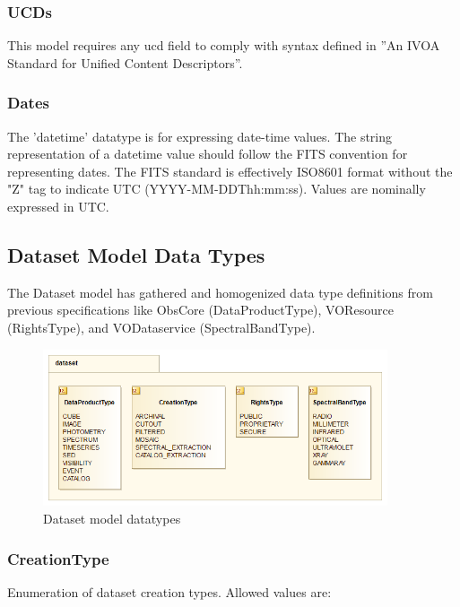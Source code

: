   \subsubsection{UCDs}
  \label{sect:ucds}
  This model requires any ucd field to comply with syntax defined in ”An IVOA
  Standard for Unified Content Descriptors”\citep{2005ivoa.spec.0819D}.
  
  \subsubsection{Dates}
  \label{sect:dates}
  The 'datetime' datatype is for expressing date-time values. The string
  representation of a datetime value should follow the FITS convention for
  representing dates. The FITS standard is effectively ISO8601 format without
  the "Z" tag to indicate UTC (YYYY-MM-DDThh:mm:ss).
  Values are nominally expressed in UTC.


\pagebreak
\subsection{Dataset Model Data Types}
The Dataset model has gathered and homogenized data type definitions from
previous specifications like ObsCore (DataProductType), VOResource (RightsType),
and VODataservice (SpectralBandType).

  \begin{figure}[h]
  \begin{center}
    \includegraphics[width=4.0in]{diagrams/DataTypes.png}
    \caption{Dataset model datatypes}\label{fig:dtypes}
  \end{center}
  \end{figure}

  \subsubsection{CreationType}
  \label{sect:creation}
  Enumeration of dataset creation types. Allowed values are:

